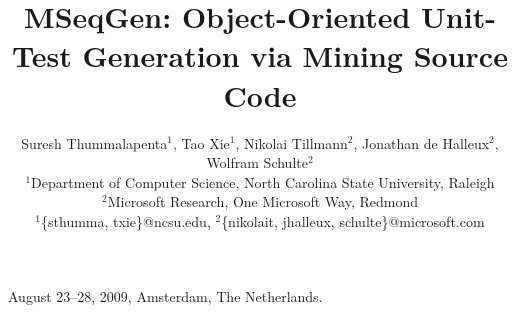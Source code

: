 \documentclass{sig-alternate}
\begin{document}
 {August 23--28, 2009, Amsterdam, The Netherlands.} 

\title{MSeqGen: Object-Oriented Unit-Test Generation via Mining Source Code}
%
%
%
%
%

%

\author{Suresh Thummalapenta$^1$, Tao Xie$^1$, Nikolai Tillmann$^2$, Jonathan de Halleux$^2$, Wolfram Schulte$^2$\\
\small{$^1$Department of Computer Science, North Carolina State University, Raleigh}\\
\small{$^2$Microsoft Research, One Microsoft Way, Redmond}\\
\small{$^1$\{sthumma, txie\}@ncsu.edu, $^2$\{nikolait, jhalleux, schulte\}@microsoft.com}\\
}
\end{document}
